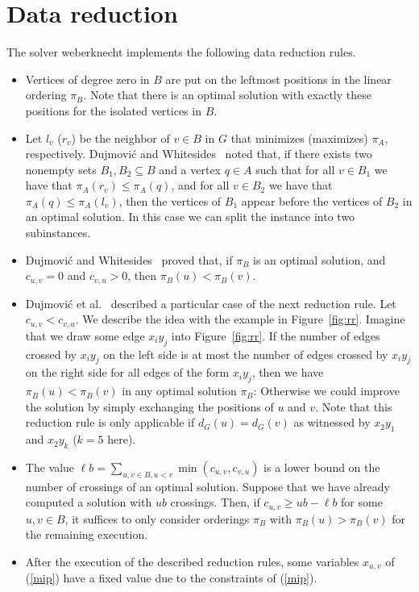 \documentclass[a4paper,UKenglish,cleveref, autoref, thm-restate]{lipics-v2021}
\begin{document}
\section{Data reduction}\label{sec:red}
The solver \textsf{weberknecht} implements the following data reduction rules.
\begin{itemize}
\item Vertices of degree zero in $B$ are put on the leftmost positions in the linear ordering $\pi_B$.
Note that there is an optimal solution with exactly these positions for the isolated vertices in $B$.
\item Let $l_v$ ($r_v$) be the neighbor of $v \in B$ in $G$ that minimizes (maximizes) $\pi_A$, respectively.
Dujmovi\'c and Whitesides~\cite{dujmovic2004efficient} noted that, if there exists two nonempty sets $B_1, B_2 \subseteq B$ and a vertex $q \in A$ such that for all $v \in B_1$ we have that $\pi_A(r_v) \leq \pi_A(q)$, and for all $v \in B_2$ we have that $\pi_A(q) \leq \pi_A(l_v)$,
then the vertices of $B_1$ appear before the vertices of $B_2$ in an optimal solution.
In this case we can split the instance into two subinstances.
\item Dujmovi\'c and Whitesides~\cite{dujmovic2004efficient} proved that, 
if $\pi_B$ is an optimal solution, and $c_{u, v} = 0$ and $c_{v, u} > 0$,
then $\pi_B(u) < \pi_B(v)$.
\item Dujmovi\'{c} et al.~\cite{dujmovic2008fixed} described a particular case of the next reduction rule.
Let $c_{u, v} < c_{v, u}$. 
We describe the idea with the example in Figure~\ref{fig:rr}.
Imagine that we draw some edge $x_iy_j$ into Figure~\ref{fig:rr}.
If the number of edges crossed by $x_iy_j$ on the left side is at most the number of edges crossed by $x_iy_j$ on the right side for all edges of the form $x_iy_j$, then we have $\pi_B(u) < \pi_B(v)$ in any optimal solution $\pi_B$:
Otherwise we could improve the solution by simply exchanging the positions of $u$ and $v$.
Note that this reduction rule is only applicable if $d_G(u) = d_G(v)$ as witnessed by $x_2y_1$ and $x_2y_k$ ($k=5$ here).
\item The value $\ell b = \sum_{u, v \in B, u < v} \min(c_{u,v}, c_{v,u})$ is a lower bound on the number of crossings of an optimal solution.
Suppose that we have already computed a solution with $ub$ crossings.
Then, if $c_{u,v} \geq ub - \ell b$ for some $u, v \in B$, it suffices to only consider orderings $\pi_B$ with $\pi_B(u) > \pi_B(v)$ for the remaining execution.
\item After the execution of the described reduction rules, some variables $x_{u,v}$ of (\ref{mip}) have a fixed value due to the constraints of (\ref{mip}).
\end{itemize}
\end{document}
